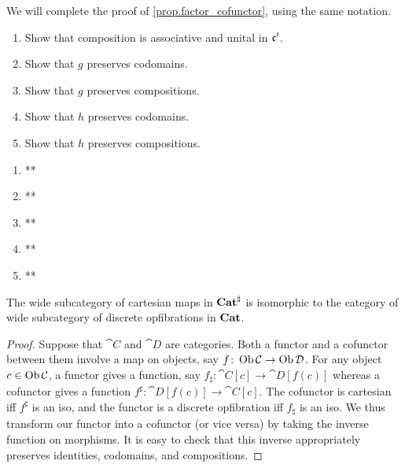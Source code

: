 \documentclass[Book-Poly]{subfiles}
\begin{document}
\begin{exercise}\label{exc.factor_cofunctor}
We will complete the proof of \cref{prop.factor_cofunctor}, using the same notation.
\begin{enumerate}
	\item Show that composition is associative and unital in $\mathfrak{c'}$.
	\item Show that $g$ preserves codomains.
	\item Show that $g$ preserves compositions.
	\item Show that $h$ preserves codomains.
	\item Show that $h$ preserves compositions.
\qedhere
\end{enumerate}
\begin{solution}
\begin{enumerate}
    \item **
    \item **
    \item **
    \item **
    \item **
\end{enumerate}
\end{solution}
\end{exercise}


\begin{proposition}
The wide subcategory of cartesian maps in $\mathbf{Cat}^\sharp$ is isomorphic to the category of wide subcategory of discrete opfibrations in $\mathbf{Cat}$.
\end{proposition}
\begin{proof}
Suppose that $\cat{C}$ and $\cat{D}$ are categories. Both a functor and a cofunctor between them involve a map on objects, say $f\colon\operatorname{Ob}\mathcal{C}\to\operatorname{Ob}\mathcal{D}$. For any object $c\in\operatorname{Ob}\mathcal{C}$, a functor gives a function, say $f_\sharp\colon\cat{C}[c]\to\cat{D}[f(c)]$ whereas a cofunctor gives a function $f^\sharp\colon\cat{D}[f(c)]\to\cat{C}[c]$. The cofunctor is cartesian iff $f^\sharp$ is an iso, and the functor is a discrete opfibration iff $f_\sharp$ is an iso. We thus transform our functor into a cofunctor (or vice versa) by taking the inverse function on morphisms. It is easy to check that this inverse appropriately preserves identities, codomains, and compositions.
\end{proof}
\end{document}
